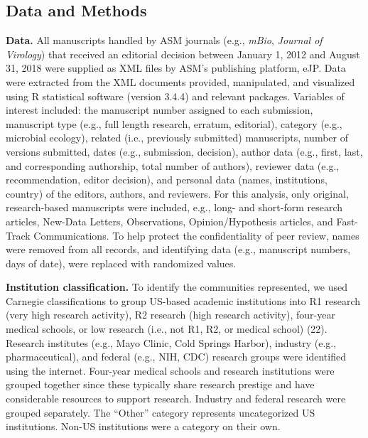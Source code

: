\documentclass[11pt,]{article}
\begin{document}
\subsection{Data and Methods}\label{data-and-methods}

\textbf{Data.} All manuscripts handled by ASM journals (e.g.,
\emph{mBio}, \emph{Journal of Virology}) that received an editorial
decision between January 1, 2012 and August 31, 2018 were supplied as
XML files by ASM's publishing platform, eJP. Data were extracted from
the XML documents provided, manipulated, and visualized using R
statistical software (version 3.4.4) and relevant packages. Variables of
interest included: the manuscript number assigned to each submission,
manuscript type (e.g., full length research, erratum, editorial),
category (e.g., microbial ecology), related (i.e., previously submitted)
manuscripts, number of versions submitted, dates (e.g., submission,
decision), author data (e.g., first, last, and corresponding authorship,
total number of authors), reviewer data (e.g., recommendation, editor
decision), and personal data (names, institutions, country) of the
editors, authors, and reviewers. For this analysis, only original,
research-based manuscripts were included, e.g., long- and short-form
research articles, New-Data Letters, Observations, Opinion/Hypothesis
articles, and Fast-Track Communications. To help protect the
confidentiality of peer review, names were removed from all records, and
identifying data (e.g., manuscript numbers, days of date), were replaced
with randomized values.

\textbf{Institution classification.} To identify the communities
represented, we used Carnegie classifications to group US-based academic
institutions into R1 research (very high research activity), R2 research
(high research activity), four-year medical schools, or low research
(i.e., not R1, R2, or medical school) (22). Research institutes (e.g.,
Mayo Clinic, Cold Springs Harbor), industry (e.g., pharmaceutical), and
federal (e.g., NIH, CDC) research groups were identified using the
internet. Four-year medical schools and research institutions were
grouped together since these typically share research prestige and have
considerable resources to support research. Industry and federal
research were grouped separately. The ``Other'' category represents
uncategorized US institutions. Non-US institutions were a category on
their own.
\end{document}
